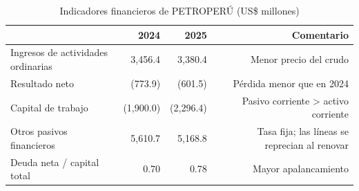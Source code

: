 \begin{table}[htbp]\centering\small
\caption{Indicadores financieros de PETROPERÚ (US\$ millones)}\label{tab:indicadores}
\begin{tabular}{lrrr}
\toprule
 & \textbf{2024} & \textbf{2025} & \textbf{Comentario} \\
\midrule
Ingresos de actividades ordinarias & 3,456.4 & 3,380.4 & Menor precio del crudo \\
Resultado neto & (773.9) & (601.5) & Pérdida menor que en 2024 \\
Capital de trabajo & (1,900.0) & (2,296.4) & Pasivo corriente > activo corriente \\
Otros pasivos financieros & 5,610.7 & 5,168.8 & Tasa fija; las líneas se reprecian al renovar \\
Deuda neta / capital total & 0.70 & 0.78 & Mayor apalancamiento \\
\bottomrule
\end{tabular}
\end{table}
